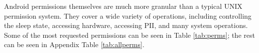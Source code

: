 Android permissions themselves are much more granular than a typical UNIX permission system. They cover a wide variety of operations, including controlling the sleep state, accessing hardware, accessing PII, and many system operations. Some of the most requested permissions can be seen in Table \ref{tab:perms}; the rest can be seen in Appendix Table \ref{tab:allperms}.






